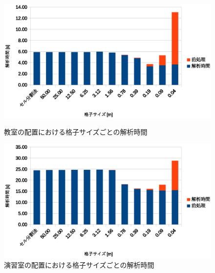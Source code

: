 \begin{figure}[tb]
	\begin{minipage}[b]{0.48\columnwidth}
		\begin{center}
		\includegraphics[width=\columnwidth]{figure/20231016_kyositu_time.eps}
		\caption{教室の配置における格子サイズごとの解析時間}
		\label{fig:kyositu_time}
		\end{center}
	\end{minipage}
	\hspace{0.04\columnwidth}
	\begin{minipage}[b]{0.48\columnwidth}
		\begin{center}
		\includegraphics[width=\columnwidth]{figure/20231016_pc_time.eps}
		\caption{演習室の配置における格子サイズごとの解析時間}
		\label{fig:pc_time}
		\end{center}
	\end{minipage}
\end{figure}

